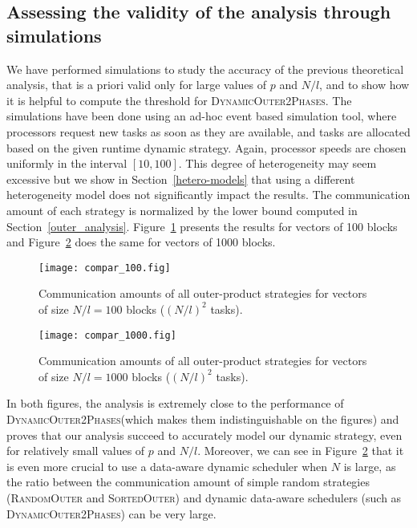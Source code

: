 \documentclass[a4paper,10pt]{article}
\newcommand{\simplerandom}{\textsc{Random\-Outer}\xspace}
\newcommand{\simplesorted}{\textsc{Sorted\-Outer}\xspace}
\newcommand{\stupidthreshold}{\textsc{Dynamic\-Outer\-2Phases}\xspace}
\begin{document}
\subsection{Assessing the validity of the analysis through simulations}
\label{simuouter}

We have performed simulations to study the accuracy of the previous
theoretical analysis, that is a priori valid only for large values of
$p$ and $N/l$, and to show how it is helpful to compute the threshold
for \stupidthreshold. The simulations have been done using an ad-hoc
event based simulation tool, where processors request new tasks as
soon as they are available, and tasks are allocated based on the given
runtime dynamic strategy. Again, processor speeds are chosen uniformly
in the interval $[10, 100]$.  This degree of heterogeneity may seem
excessive but we show in Section~\ref{hetero-models} that using a
different heterogeneity model does not significantly impact the
results.  The communication amount of each strategy is normalized by
the lower bound computed in
Section~\ref{outer_analysis}. Figure~\ref{fig.simubasicP100} presents
the results for vectors of 100 blocks and
Figure~\ref{fig.simubasicP1000} does the same for vectors of 1000
blocks.

\begin{figure}[htbp]
  \centering
  \texttt{[image: compar\_100.fig]}
  \caption{Communication amounts of all outer-product strategies for vectors of size $N/l=100$ blocks ($(N/l)^2$ tasks).}
  \label{fig.simubasicP100}
\end{figure}

\begin{figure}[htbp]
  \centering
  \texttt{[image: compar\_1000.fig]}
  \caption{Communication amounts of all outer-product strategies for vectors of size $N/l=1000$ blocks ($(N/l)^2$ tasks).}
  \label{fig.simubasicP1000}
\end{figure}

In both figures, the analysis is extremely close to the performance of
\stupidthreshold (which makes them indistinguishable on the figures)
and proves that our analysis succeed to accurately model our dynamic
strategy, even for relatively small values of $p$ and $N/l$. Moreover, we can see in Figure~\ref{fig.simubasicP1000} that it
is even more crucial to use a data-aware dynamic scheduler when $N$ is
large, as the ratio between the communication amount of simple random
strategies (\simplerandom and \simplesorted) and dynamic data-aware
schedulers (such as \stupidthreshold) can be very large.
\end{document}
